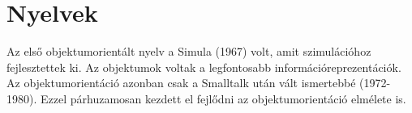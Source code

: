 \documentclass[]{thesis-ekf}
\theoremstyle{definition}
\begin{document}
	
	
	
	
	\chapter{Nyelvek}\label{fejezet-nyelvek}
	
	Az első objektumorientált nyelv a Simula (1967) volt, amit szimulációhoz fejlesztettek ki. Az objektumok voltak a legfontosabb információreprezentációk. Az objektumorientáció azonban csak a Smalltalk után vált ismertebbé (1972-1980). Ezzel párhuzamosan kezdett el fejlődni az objektumorientáció elmélete is.
	
\end{document}
